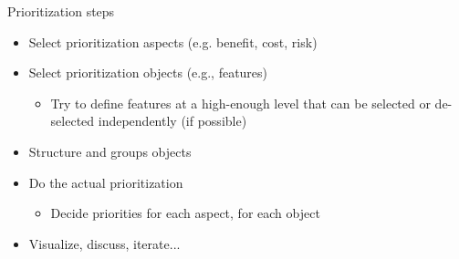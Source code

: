 \begin{Slide}{Prioritization steps}
\begin{itemize}
\item Select prioritization aspects (e.g. benefit, cost, risk)
\item Select prioritization objects (e.g., features)
\begin{itemize}
\item Try to define features at a high-enough level that can be selected or de-selected independently (if possible)
\end{itemize}
\item Structure and groups objects
\item Do the actual prioritization
\begin{itemize}
\item Decide priorities for each aspect, for each object
\end{itemize}
\item Visualize, discuss, iterate...

\end{itemize}
\end{Slide}